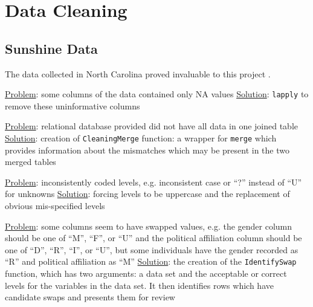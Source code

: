 \section{Data Cleaning} \label{sec:datacleaning}

\subsection{Sunshine Data}

The data collected in North Carolina proved invaluable to this project \cite{JurySunshineProj}.

\underline{Problem}: some columns of the data contained only NA values
\underline{Solution}: \texttt{lapply} to remove these uninformative columns

\underline{Problem}: relational database provided did not have all data in one joined table
\underline{Solution}: creation of \texttt{CleaningMerge} function: a wrapper for \texttt{merge} which provides information about the
mismatches which may be present in the two merged tables

\underline{Problem}: inconsistently coded levels, e.g. inconsistent case or ``?'' instead of ``U'' for unknowns
\underline{Solution}: forcing levels to be uppercase and the replacement of obvious mis-specified levels

\underline{Problem}: some columns seem to have swapped values, e.g. the gender column should be one of ``M'', ``F'', or ``U'' and the
political affiliation column should be one of ``D'', ``R'', ``I'', or ``U'', but some individuals have the gender recorded as
``R'' and political affiliation as ``M''
\underline{Solution}: the creation of the \texttt{IdentifySwap} function, which has two arguments: a data set and the acceptable or correct
levels for the variables in the data set. It then identifies rows which have candidate swaps and presents them for review
